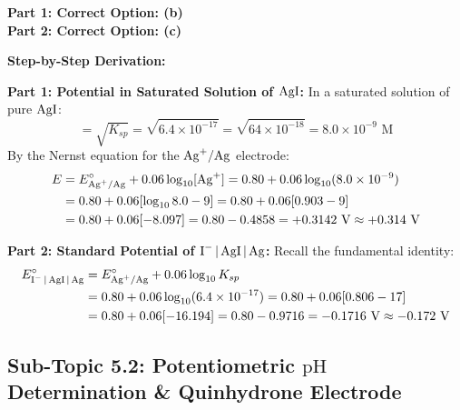 \begin{solution}
\textbf{Part 1: Correct Option: (b)} \\
\textbf{Part 2: Correct Option: (c)}

\textbf{Step-by-Step Derivation:}

\textbf{Part 1: Potential in Saturated Solution of $\ce{AgI}$:}
In a saturated solution of pure $\ce{AgI}$:
\begin{equation*}
    [\ce{Ag+}] = \sqrt{K_{sp}} = \sqrt{6.4 \times 10^{-17}} = \sqrt{64 \times 10^{-18}} = 8.0 \times 10^{-9}\text{ M}
\end{equation*}
By the Nernst equation for the $\ce{Ag+/Ag}$ electrode:
\begin{align*}
    E &= E^\circ_{\ce{Ag+/Ag}} + 0.06 \log_{10}[\ce{Ag+}] = 0.80 + 0.06 \log_{10}(8.0 \times 10^{-9}) \\
    &= 0.80 + 0.06 [\log_{10} 8.0 - 9] = 0.80 + 0.06 [0.903 - 9] \\
    &= 0.80 + 0.06 [-8.097] = 0.80 - 0.4858 = +0.3142\text{ V} \approx +0.314\text{ V}
\end{align*}

\textbf{Part 2: Standard Potential of $\ce{I- | AgI | Ag}$:}
Recall the fundamental identity:
\begin{align*}
    E^\circ_{\ce{I- | AgI | Ag}} &= E^\circ_{\ce{Ag+/Ag}} + 0.06 \log_{10} K_{sp} \\
    &= 0.80 + 0.06 \log_{10}(6.4 \times 10^{-17}) = 0.80 + 0.06 [0.806 - 17] \\
    &= 0.80 + 0.06 [-16.194] = 0.80 - 0.9716 = -0.1716\text{ V} \approx -0.172\text{ V}
\end{align*}
\end{solution}

\subsection{Sub-Topic 5.2: Potentiometric $\text{pH}$ Determination \& Quinhydrone Electrode}

